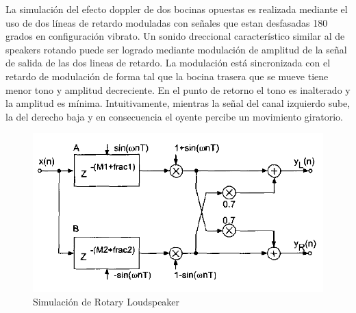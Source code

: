 \documentclass[assd_tp2_main.tex]{subfiles}
\begin{document}
\begin{thebibliography}{9}
La simulación del efecto doppler de dos bocinas opuestas es realizada mediante el uso de dos líneas de retardo moduladas con señales que estan desfasadas 180 grados en configuración vibrato. Un sonido dreccional característico similar al de speakers rotando puede ser logrado mediante modulación de amplitud de la señal de salida de las dos lineas de retardo.
La modulación está sincronizada con el retardo de modulación de forma tal que la bocina trasera que se mueve tiene menor tono y amplitud decreciente. En el punto de retorno el tono es inalterado y la amplitud es mínima. 
Intuitivamente, mientras la señal del canal izquierdo sube, la del derecho baja y en consecuencia el oyente percibe un movimiento giratorio.
\begin{figure}[H]
\centering
\includegraphics[width=0.4\linewidth]{graficos/EJ4/RLsimulacion.png}
\caption{Simulación de Rotary Loudspeaker}
\label{fig:RLsimulacion}
\end{figure}

\end{thebibliography}
\end{document}
